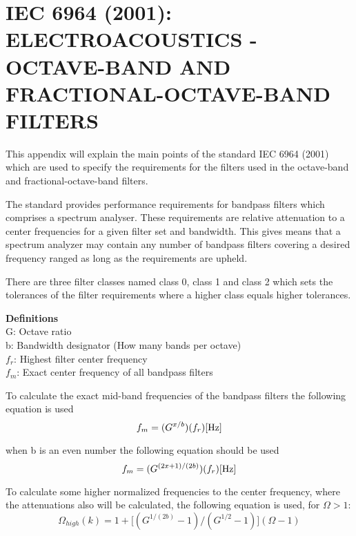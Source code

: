 \chapter{IEC 6964 (2001): ELECTROACOUSTICS - OCTAVE-BAND AND FRACTIONAL-OCTAVE-BAND FILTERS} \label{app:IEC6964}
This appendix will explain the main points of the standard IEC 6964 (2001) which are used to specify the requirements for the filters used in the octave-band and fractional-octave-band filters.

The standard provides performance requirements for bandpass filters which comprises a spectrum analyser. These requirements are relative attenuation to a center frequencies for a given filter set and bandwidth. This gives means that a spectrum analyzer may contain any number of bandpass filters covering a desired frequency ranged as long as the requirements are upheld. 

There are three filter classes named class 0, class 1 and class 2 which sets the tolerances of the filter requirements where a higher class equals higher tolerances.  

\textbf{Definitions} \\
G: Octave ratio \\
b: Bandwidth designator (How many bands per octave) \\
$f_r$: Highest filter center frequency \\
$f_m$: Exact center frequency of all bandpass filters

To calculate the exact mid-band frequencies of the bandpass filters the following equation is used
\begin{equation}
f_m=(G^{x/b})(f_r) \enhed{Hz}
\end{equation}
\begin{where}
\end{where}

when b is an even number the following equation should be used
\begin{equation}
f_m=(G^{(2x+1)/(2b)})(f_r) \enhed{Hz}
\end{equation}

To calculate some higher normalized frequencies to the center frequency,  where the attenuations also will be calculated, the following equation is used, for $\Omega > 1$:
\begin{equation}
\Omega_{high}(k) = 1+\Big[(G^{1/(2b)}-1)/(G^{1/2}-1)\Big](\Omega-1)
\end{equation}
\begin{where}
\end{where}

